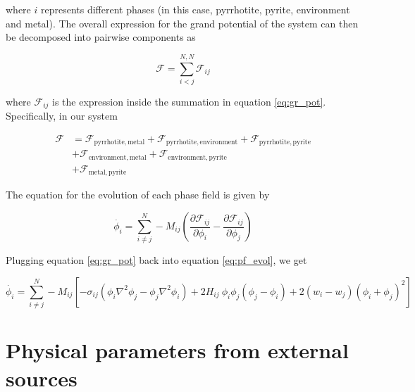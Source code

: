 \documentclass{article}
\begin{document}
where $i$ represents different phases (in this case, pyrrhotite, pyrite, environment and metal). The overall expression for the grand potential of the system can then be decomposed into pairwise components as

\begin{equation}
  \mathcal{F} = \sum\limits_{i<j}^{N,N}\mathcal{F}_{ij}
\end{equation}


where $\mathcal{F}_{ij}$ is the expression inside the summation in equation \ref{eq:gr_pot}. Specifically, in our system

\begin{equation}\label{eq:split_f}
  \begin{split}
  \mathcal{F} &= \mathcal{F}_{\mathrm{pyrrhotite,metal}} + \mathcal{F}_{\mathrm{pyrrhotite,environment}} + \mathcal{F}_{\mathrm{pyrrhotite,pyrite}} \\
              &+ \mathcal{F}_{\mathrm{environment,metal}} + \mathcal{F}_{\mathrm{environment,pyrite}} \\
              &+ \mathcal{F}_{\mathrm{metal,pyrite}}
  \end{split}
\end{equation}


The equation for the evolution of each phase field is given by


\begin{equation}\label{eq:pf_evol}
  \dot{\phi_i} = \sum\limits_{i\neq j}^N -M_{ij}\left(  \frac{\partial\mathcal{F}_{ij}}{\partial \phi_i} - \frac{\partial\mathcal{F}_{ij}}{\partial \phi_j}  \right)
\end{equation}


Plugging equation \ref{eq:gr_pot} back into equation \ref{eq:pf_evol}, we get

\begin{equation}
  \dot{\phi_i} = \sum\limits_{i\neq j}^N -M_{ij}\left[ -\sigma_{ij}\left(\phi_i\nabla^2\phi_j-\phi_j\nabla^2\phi_i\right) + 2H_{ij}\ \phi_i\phi_j (\phi_j-\phi_i) + 2(w_i-w_j)(\phi_i+\phi_j)^2\right]
\end{equation}













\section{Physical parameters from external sources}
\end{document}
